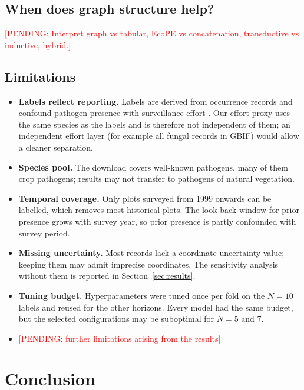 \documentclass[a4paper,fleqn]{cas-sc}
\newcommand{\pending}[1]{\textcolor{red}{[PENDING: #1]}}
\begin{document}
\subsection{When does graph structure help?}

\pending{Interpret graph vs tabular, EcoPE vs concatenation, transductive vs inductive, hybrid.}

\subsection{Limitations}

\begin{itemize}[leftmargin=1.4em]
  \item \textbf{Labels reflect reporting.} Labels are derived from occurrence records and confound pathogen presence with surveillance effort \citep{beck2014}. Our effort proxy uses the same \gbifSpecies{} species as the labels and is therefore not independent of them; an independent effort layer (for example all fungal records in GBIF) would allow a cleaner separation.
  \item \textbf{Species pool.} The download covers \gbifSpecies{} well-known pathogens, many of them crop pathogens; results may not transfer to pathogens of natural vegetation.
  \item \textbf{Temporal coverage.} Only plots surveyed from 1999 onwards can be labelled, which removes most historical plots. The look-back window for prior presence grows with survey year, so prior presence is partly confounded with survey period.
  \item \textbf{Missing uncertainty.} Most records lack a coordinate uncertainty value; keeping them may admit imprecise coordinates. The sensitivity analysis without them is reported in Section~\ref{sec:results}.
  \item \textbf{Tuning budget.} Hyperparameters were tuned once per fold on the $N = 10$ labels and reused for the other horizons. Every model had the same budget, but the selected configurations may be suboptimal for $N = 5$ and 7.
  \item \pending{further limitations arising from the results}
\end{itemize}

\section{Conclusion}
\label{sec:conclusion}
\end{document}
